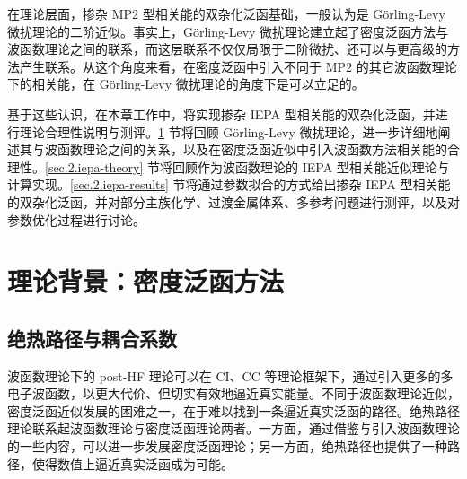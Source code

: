 在理论层面，掺杂 MP2 型相关能的双杂化泛函基础，一般认为是 G\"orling-Levy 微扰理论的二阶近似。事实上，G\"orling-Levy 微扰理论建立起了密度泛函方法与波函数理论之间的联系，而这层联系不仅仅局限于二阶微扰、还可以与更高级的方法产生联系。从这个角度来看，在密度泛函中引入不同于 MP2 的其它波函数理论下的相关能，在 G\"orling-Levy 微扰理论的角度下是可以立足的。

基于这些认识，在本章工作中，将实现掺杂 IEPA 型相关能的双杂化泛函，并进行理论合理性说明与测评。\ref{sec.2.iepa-gl-perturb} 节将回顾 G\"orling-Levy 微扰理论，进一步详细地阐述其与波函数理论之间的关系，以及在密度泛函近似中引入波函数方法相关能的合理性。\ref{sec.2.iepa-theory} 节将回顾作为波函数理论的 IEPA 型相关能近似理论与计算实现。\ref{sec.2.iepa-results} 节将通过参数拟合的方式给出掺杂 IEPA 型相关能的双杂化泛函，并对部分主族化学、过渡金属体系、多参考问题进行测评，以及对参数优化过程进行讨论。

\section{理论背景：密度泛函方法}
\label{sec.2.iepa-gl-perturb}

\subsection{绝热路径与耦合系数}

波函数理论下的 post-HF 理论可以在 CI、CC 等理论框架下，通过引入更多的多电子波函数，以更大代价、但切实有效地逼近真实能量。不同于波函数理论近似，密度泛函近似发展的困难之一，在于难以找到一条逼近真实泛函的路径。绝热路径理论联系起波函数理论与密度泛函理论两者。一方面，通过借鉴与引入波函数理论的一些内容，可以进一步发展密度泛函理论；另一方面，绝热路径也提供了一种路径，使得数值上逼近真实泛函成为可能。

